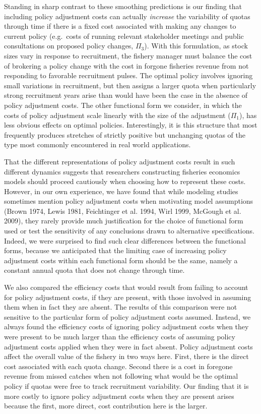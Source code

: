 \documentclass[review,12pt,author-year,titlepage]{components/elsarticle} %
\begin{document}
\begin{flushleft}
Standing in sharp contrast to these smoothing predictions is our finding
that including policy adjustment costs can actually \emph{increase} the
variability of quotas through time if there is a fixed cost associated
with making any changes to current policy (e.g.~costs of running
relevant stakeholder meetings and public consultations on proposed
policy changes, \(\Pi_3\)). With this formulation, as stock sizes vary
in response to recruitment, the fishery manager must balance the cost of
brokering a policy change with the cost in forgone fisheries revenue
from not responding to favorable recruitment pulses. The optimal policy
involves ignoring small variations in recruitment, but then assigns a
larger quota when particularly strong recruitment years arise than would
have been the case in the absence of policy adjustment costs. The other
functional form we consider, in which the costs of policy adjustment
scale linearly with the size of the adjustment (\(\Pi_1\)), has less
obvious effects on optimal policies. Interestingly, it is this structure
that most frequently produces stretches of strictly positive but
unchanging quotas of the type most commonly encountered in real world
applications.

That the different representations of policy adjustment costs result in
such different dynamics suggests that researchers constructing fisheries
economics models should proceed cautiously when choosing how to
represent these costs. However, in our own experience, we have found
that while modeling studies sometimes mention policy adjustment costs
when motivating model assumptions (Brown 1974, Lewis 1981, Feichtinger
et al. 1994, Wirl 1999, McGough et al. 2009), they rarely provide much
justification for the choice of functional form used or test the
sensitivity of any conclusions drawn to alternative specifications.
Indeed, we were surprised to find such clear differences between the
functional forms, because we anticipated that the limiting case of
increasing policy adjustment costs within each functional form should be
the same, namely a constant annual quota that does not change through
time.

We also compared the efficiency costs that would result from failing to
account for policy adjustment costs, if they are present, with those
involved in assuming them when in fact they are absent. The results of
this comparison were not sensitive to the particular form of policy
adjustment costs assumed. Instead, we always found the efficiency costs
of ignoring policy adjustment costs when they were present to be much
larger than the efficiency costs of assuming policy adjustment costs
applied when they were in fact absent. Policy adjustment costs affect
the overall value of the fishery in two ways here. First, there is the
direct cost associated with each quota change. Second there is a cost in
foregone revenue from missed catches when not following what would be
the optimal policy if quotas were free to track recruitment variability.
Our finding that it is more costly to ignore policy adjustment costs
when they are present arises because the first, more direct, cost
contribution here is the larger.


\end{flushleft}
\end{document}
